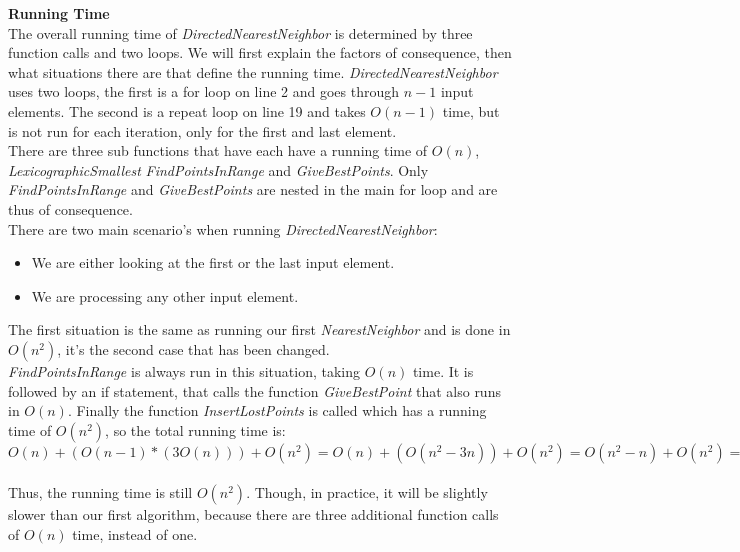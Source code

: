     \noindent\textbf{Running Time}\\
       The overall running time of \textit{DirectedNearestNeighbor} is determined by three function calls and two loops. We will first explain the factors of consequence, then what situations there are that define the running time.
       \textit{DirectedNearestNeighbor} uses two loops, the first is a for loop on line 2 and goes through $n-1$ input elements. The second is a repeat loop on line 19 and takes $O(n-1)$ time, but is not run for each iteration, only for the first and last element. \\
        There are three sub functions that have each have a running time of $O(n)$, \textit{LexicographicSmallest}  \textit{FindPointsInRange} and \textit{GiveBestPoints}. Only \textit{FindPointsInRange} and \textit{GiveBestPoints} are nested in the main for loop and are thus of consequence.\\
        There are two main scenario's when running \textit{DirectedNearestNeighbor}:\\
        \begin{itemize}
          \item We are either looking at the first or the last input element.
          \item We are processing any other input element.
        \end{itemize}
         The first situation is the same as running our first \textit{NearestNeighbor} and is done in $O(n^{2})$, it's the second case that has been changed.\\
         \textit{FindPointsInRange} is always run in this situation, taking $O(n)$ time. It is followed by an if statement, that calls the function \textit{GiveBestPoint} that also runs in $O(n)$. Finally the function \textit{InsertLostPoints} is called which has a running time of $O(n^{2})$, so the total running time is: \\
             $O(n) + (O(n-1)*(3O(n))) + O(n^{2}) = O(n) + (O(n^{2} - 3n)) + O(n^{2}) = O(n^{2} - n) + O(n^{2}) = O(n^{2})$ \\ \\
          Thus, the running time is still $O(n^{2})$. Though, in practice, it will be slightly slower than our first algorithm, because there are three additional function calls of $O(n)$ time, instead of one. 